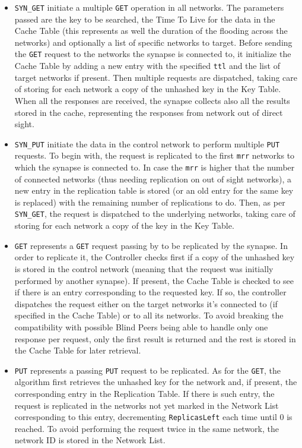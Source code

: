\begin{itemize}
\item {\tt SYN\_GET} initiate a multiple {\tt GET} operation in all
  networks. The parameters passed are the key to be searched, the Time
  To Live for the data in the Cache Table (this represents as well the
  duration of the flooding across the networks) and optionally a list
  of specific networks to target.  Before sending the {\tt GET}
  request to the networks the synapse is connected to, it initialize
  the Cache Table by adding a new entry with the specified {\tt ttl}
  and the list of target networks if present. Then multiple requests
  are dispatched, taking care of storing for each network a copy of
  the unhashed key in the Key Table.  When all the responses are
  received, the synapse collects also all the results stored in the
  cache, representing the responses from network out of direct sight.
\item {\tt SYN\_PUT} initiate the data in the control network to
  perform multiple {\tt PUT} requests. To begin with, the request is
  replicated to the first {\tt mrr} networks to which the synapse is
  connected to. In case the {\tt mrr} is higher that the number of
  connected networks (thus needing replication on out of sight
  networks), a new entry in the replication table is stored (or an old
  entry for the same key is replaced) with the remaining number of
  replications to do. Then, as per {\tt SYN\_GET}, the request is
  dispatched to the underlying networks, taking care of storing for
  each network a copy of the key in the Key Table.
\item {\tt GET} represents a {\tt GET} request passing by to be
  replicated by the synapse. In order to replicate it, the Controller
  checks first if a copy of the unhashed key is stored in the control
  network (meaning that the request was initially performed by another
  synapse). If present, the Cache Table is checked to see if there is
  an entry corresponding to the requested key. If so, the controller
  dispatches the request either on the target networks it's connected
  to (if specified in the Cache Table) or to all its networks. To
  avoid breaking the compatibility with possible Blind Peers being
  able to handle only one response per request, only the first result
  is returned and the rest is stored in the Cache Table for later
  retrieval.
\item {\tt PUT} represents a passing {\tt PUT} request to be
  replicated. As for the {\tt GET}, the algorithm first retrieves the
  unhashed key for the network and, if present, the corresponding
  entry in the Replication Table. If there is such entry, the request
  is replicated in the networks not yet marked in the Network List
  corresponding to this entry, decrementing {\tt ReplicasLeft} each
  time until 0 is reached. To avoid performing the request twice in
  the same network, the network ID is stored in the Network List.
\end{itemize}

